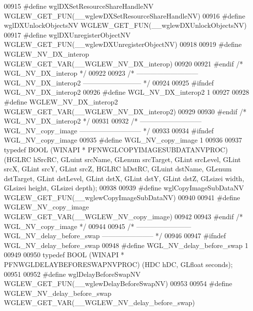 \begin{DoxyCode}
00915 \textcolor{preprocessor}{#define wglDXSetResourceShareHandleNV WGLEW\_GET\_FUN(\_\_wglewDXSetResourceShareHandleNV)}
00916 \textcolor{preprocessor}{#define wglDXUnlockObjectsNV WGLEW\_GET\_FUN(\_\_wglewDXUnlockObjectsNV)}
00917 \textcolor{preprocessor}{#define wglDXUnregisterObjectNV WGLEW\_GET\_FUN(\_\_wglewDXUnregisterObjectNV)}
00918 
00919 \textcolor{preprocessor}{#define WGLEW\_NV\_DX\_interop WGLEW\_GET\_VAR(\_\_WGLEW\_NV\_DX\_interop)}
00920 
00921 \textcolor{preprocessor}{#endif }\textcolor{comment}{/* WGL\_NV\_DX\_interop */}\textcolor{preprocessor}{}
00922 
00923 \textcolor{comment}{/* --------------------------- WGL\_NV\_DX\_interop2 -------------------------- */}
00924 
00925 \textcolor{preprocessor}{#ifndef WGL\_NV\_DX\_interop2}
00926 \textcolor{preprocessor}{#define WGL\_NV\_DX\_interop2 1}
00927 
00928 \textcolor{preprocessor}{#define WGLEW\_NV\_DX\_interop2 WGLEW\_GET\_VAR(\_\_WGLEW\_NV\_DX\_interop2)}
00929 
00930 \textcolor{preprocessor}{#endif }\textcolor{comment}{/* WGL\_NV\_DX\_interop2 */}\textcolor{preprocessor}{}
00931 
00932 \textcolor{comment}{/* --------------------------- WGL\_NV\_copy\_image --------------------------- */}
00933 
00934 \textcolor{preprocessor}{#ifndef WGL\_NV\_copy\_image}
00935 \textcolor{preprocessor}{#define WGL\_NV\_copy\_image 1}
00936 
00937 \textcolor{keyword}{typedef} BOOL (WINAPI * PFNWGLCOPYIMAGESUBDATANVPROC) (HGLRC hSrcRC, GLuint 
      srcName, GLenum srcTarget, GLint srcLevel, GLint srcX, GLint srcY, GLint srcZ, 
      HGLRC hDstRC, GLuint dstName, GLenum dstTarget, GLint dstLevel, GLint dstX, 
      GLint dstY, GLint dstZ, GLsizei width, GLsizei height, GLsizei depth);
00938 
00939 \textcolor{preprocessor}{#define wglCopyImageSubDataNV WGLEW\_GET\_FUN(\_\_wglewCopyImageSubDataNV)}
00940 
00941 \textcolor{preprocessor}{#define WGLEW\_NV\_copy\_image WGLEW\_GET\_VAR(\_\_WGLEW\_NV\_copy\_image)}
00942 
00943 \textcolor{preprocessor}{#endif }\textcolor{comment}{/* WGL\_NV\_copy\_image */}\textcolor{preprocessor}{}
00944 
00945 \textcolor{comment}{/* ------------------------ WGL\_NV\_delay\_before\_swap ----------------------- */}
00946 
00947 \textcolor{preprocessor}{#ifndef WGL\_NV\_delay\_before\_swap}
00948 \textcolor{preprocessor}{#define WGL\_NV\_delay\_before\_swap 1}
00949 
00950 \textcolor{keyword}{typedef} BOOL (WINAPI * PFNWGLDELAYBEFORESWAPNVPROC) (HDC hDC, GLfloat seconds);
00951 
00952 \textcolor{preprocessor}{#define wglDelayBeforeSwapNV WGLEW\_GET\_FUN(\_\_wglewDelayBeforeSwapNV)}
00953 
00954 \textcolor{preprocessor}{#define WGLEW\_NV\_delay\_before\_swap WGLEW\_GET\_VAR(\_\_WGLEW\_NV\_delay\_before\_swap)}

\end{DoxyCode}

